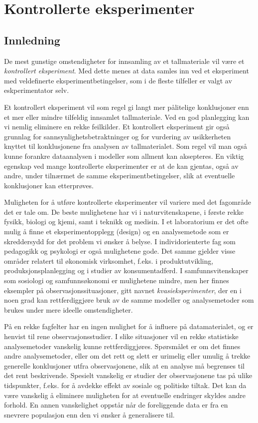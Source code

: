 \chapter{Kontrollerte eksperimenter}
\label{kap:kontrollerte} %

\section{Innledning}
De mest gunstige omstendigheter for innsamling av et tallmateriale vil
være et {\em kontrollert eksperiment}.  Med dette menes at data
samles inn ved et eksperiment med veldefinerte eksperimentbetingelser,
som i de fleste tilfeller er valgt av eskperimentator selv.

Et kontrollert eksperiment vil som regel gi langt mer pålitelige
konklusjoner enn et mer eller mindre tilfeldig innsamlet tallmateriale.
Ved en god planlegging kan vi nemlig eliminere en rekke feilkilder.
Et kontrollert eksperiment gir også grunnlag for 
sannsynlighetsbetraktninger og for vurdering av usikkerheten knyttet
til konklusjonene fra analysen av tallmaterialet.  Som regel vil man 
også kunne forankre dataanalysen i modeller som allment kan aksepteres.
En viktig egenskap ved mange kontrollerte eks\-peri\-men\-ter er at de kan 
gjentas, også av andre, under tilnærmet de samme 
eksperimentbetingelser, slik at eventuelle konklusjoner kan etterprøves.

Muligheten for å utføre kontrollerte eksperimenter vil variere 
med det fagområde det er tale om.  De beste mulighetene har vi i 
naturvitenskapene, i første rekke fysikk, biologi og kjemi, samt i
teknikk og medisin.  I et labo\-ra\-to\-rium er det ofte mulig å finne et
eksperimentopplegg (design) og en analysemetode som er skreddersydd for
det problem vi ønsker å belyse.  I individorienterte fag som
pedagogikk og psykologi er også mulighetene gode.  Det samme gjelder
visse områder relatert til økonomisk virksomhet, f.eks. i
produktutvikling, produksjonsplanlegging og i studier av 
konsu\-ment\-ad\-ferd.  I samfunnsvitenskaper som sosiologi og 
samfunnsøkonomi er mulighetene mindre, men her finnes eksempler på
observasjonssituasjoner, gitt navnet {\em kvasieksperimenter}, der en i noen
grad kan rettferdiggjøre bruk av de samme modeller og analysemetoder
som brukes under mere ideelle omstendigheter.  

På en rekke fagfelter har en ingen mulighet  for å influere på
datamaterialet, og er henvist til rene observasjonsstudier.  I slike 
situasjoner vil en rekke statistiske analysemetoder vanskelig kunne
rettferdiggjøres.  Spørsmålet er om det finnes andre 
analysemetoder, eller om det rett og slett er urimelig eller umulig å
trekke generelle konklusjoner utfra observasjonene, slik at en analyse
må begrenses til det rent beskrivende.  Spesielt vanskelig er
studier der observasjonene tas på ulike tidspunkter, f.eks. for å
avdekke effekt av sosiale og politiske tiltak.  Det kan da være 
vanskelig å eliminere muligheten for at eventuelle endringer skyldes
andre forhold.  En annen vanskelighet oppstår når de foreliggende
data er fra en snevrere populasjon enn den vi ønsker å
generalisere til.

